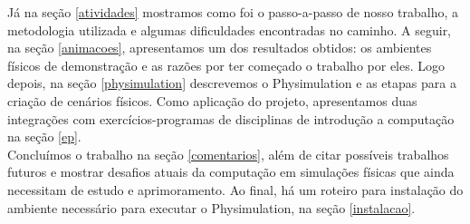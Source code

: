 Já na seção \ref{atividades} mostramos como foi o passo-a-passo de nosso trabalho, a metodologia utilizada e algumas dificuldades encontradas no caminho. A seguir, na seção \ref{animacoes}, apresentamos um dos resultados obtidos: os ambientes físicos de demonstração e as razões por ter começado o trabalho por eles. Logo depois, na seção \ref{physimulation} descrevemos o Physimulation e as etapas para a criação de cenários físicos. Como aplicação do projeto, apresentamos duas integrações com exercícios-programas de disciplinas de introdução a computação na seção \ref{ep}. \\

Concluímos o trabalho na seção \ref{comentarios}, além de citar possíveis trabalhos futuros e mostrar desafios atuais da computação em simulações físicas que ainda necessitam de estudo e aprimoramento. Ao final, há um roteiro para instalação do ambiente necessário para executar o Physimulation, na seção \ref{instalacao}. 


